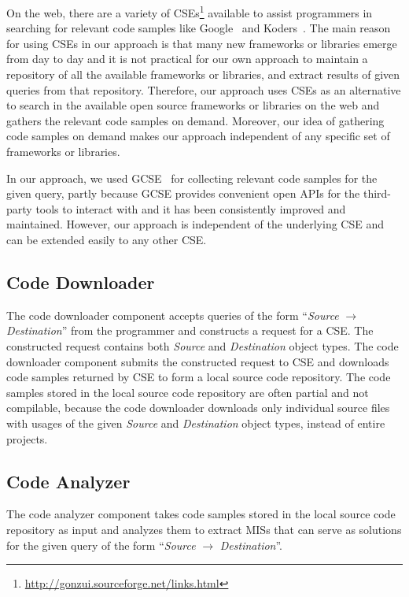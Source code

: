 On the web, there are a variety of
CSEs\footnote{\url{http://gonzui.sourceforge.net/links.html}}
available to assist programmers in searching for relevant code
samples like Google~\cite{GCSE} and Koders~\cite{KODERS}. The main reason for using CSEs in our
approach is that many new frameworks or libraries emerge from day to
day and it is not practical for our own approach to maintain a
repository of all the available frameworks or libraries, and extract
results of given queries from that repository. Therefore, our
approach uses CSEs as an alternative to search in the available open
source frameworks or libraries on the web and gathers the relevant
code samples on demand. Moreover, our idea of gathering code samples
on demand makes our approach independent of any specific set of
frameworks or libraries.

In our approach, we used GCSE~\cite{GCSE} for collecting relevant code samples for the
given query, partly because GCSE provides convenient open APIs for the
third-party tools to interact with and it has been consistently
improved and maintained. However, our approach is independent of the
underlying CSE and can be extended easily to any other CSE.

\subsection{Code Downloader}

The code downloader component accepts queries of the form
``\emph{Source} $\rightarrow$ \emph{Destination}'' from the
programmer and constructs a request for a CSE. The constructed
request contains both \emph{Source} and \emph{Destination} object
types. The code downloader component submits the constructed request
to CSE and downloads code samples returned by CSE to form a local
source code repository. The code samples stored in the local source
code repository are often partial and not compilable, because the
code downloader downloads only individual source files with usages
of the given \emph{Source} and \emph{Destination} object types,
instead of entire projects.
\subsection{Code Analyzer}
The code analyzer component takes code samples stored in the local
source code repository as input and analyzes them to extract MISs
that can serve as solutions for the given query of the form
``\emph{Source} $\rightarrow$ \emph{Destination}''.

